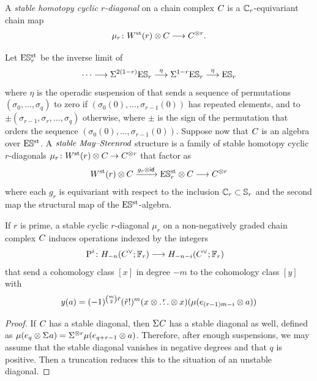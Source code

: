 \begin{definition}
	A \emph{stable homotopy cyclic $r$-diagonal} on a chain complex $C_{}$ is a $\mathbb{C}_r$-equivariant chain map
	\[
	\mu_r \colon W^{\mathrm{st}}_{}(r) \otimes C_{} \longrightarrow C_{}^{\otimes r}.
	\]
\end{definition}

	Let $\mathrm{E}\mathbb{S}^{\mathrm{st}}_r$ be the inverse limit of
	\[
	\dotsb \longrightarrow \Sigma^{2(1-r)} \mathrm{E}\mathbb{S}_r\overset{\eta}{\longrightarrow}\Sigma^{1-r} \mathrm{E}\mathbb{S}_r\overset{\eta}{\longrightarrow} \mathrm{E}\mathbb{S}_r
	\]
	where $\eta$ is the operadic suspension of \cite{berger2004combinatorial} that sends a sequence of permutations $(\sigma_0,\dots,\sigma_q)$ to zero if $(\sigma_0(0),\dots,\sigma_{r-1}(0))$ has repeated elements, and to $\pm (\sigma_{r-1},\sigma_r,\dots,\sigma_q)$ otherwise, where $\pm$ is the sign of the permutation that orders the sequence $(\sigma_0(0),\dots,\sigma_{r-1}(0))$.	Suppose now that $C_{}$ is an algebra over $\mathrm{E}\mathbb{S}^{\mathrm{st}}$. A $\emph{stable May--Steenrod}$ structure is a family of stable homotopy cyclic $r$-diagonals $\mu_r\colon W^{\mathrm{st}}_{}(r)\otimes C_{}\to C_{}^{\otimes r}$ that factor as
	\[
	W^{\mathrm{st}}_{}(r) \otimes C_{} \xrightarrow{g_r \otimes \mathsf{id}} \mathrm{E}\mathbb{S}^{\mathrm{st}}_r \otimes C_{} \longrightarrow C_{}^{\otimes r}
	\]
	where each $g_r$ is equivariant with respect to the inclusion $\mathbb{C}_r \subset \mathbb{S}_r$ and the second map the structural map of the $\mathrm{E}\mathbb{S}^{\mathrm{st}}$-algebra.






\begin{proposition}
	If $r$ is prime, a stable cyclic $r$-diagonal $\mu_r$ on a non-negatively graded chain complex $C_{}$ induces operations indexed by the integers
	\begin{align*}
		\operatorname{P}^{i} \colon H_{-n}(C^\vee_{};\mathbb{F}_r)& \longrightarrow H_{-n-i}(C^\vee_{};\mathbb{F}_r)
	\end{align*}
	that send a cohomology class $[x]$ in degree $-m$ to the cohomology class $[y]$ with
	\[
	y(a) = (-1)^{\binom{m}{2} \tilde{r}}(\tilde{r}!)^m(x \otimes \overset{r}{\dots} \otimes x)(\mu(e_{(r-1)m-i} \otimes a))
	\]
\end{proposition}

\begin{proof}
	If $C_{}$ has a stable diagonal, then $\Sigma^{} C_{}$ has a stable diagonal as well, defined as $\mu(e_q \otimes \Sigma^{} a) = \Sigma^{\otimes r}\mu(e_{q+r-1} \otimes a)$.
	Therefore, after enough suspensions, we may assume that the stable diagonal vanishes in negative degrees and that $q$ is positive.
	Then a truncation reduces this to the situation of an unstable diagonal.
\end{proof}

